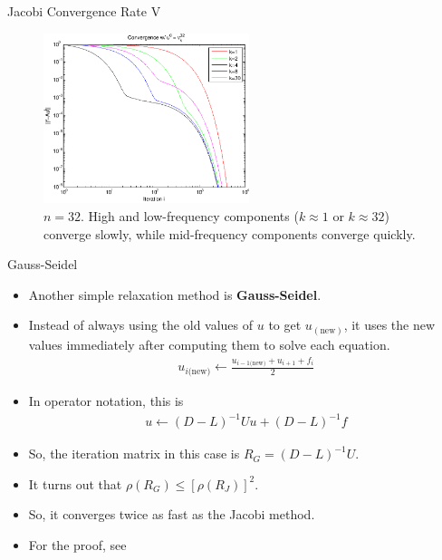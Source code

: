 \documentclass{beamer}
\begin{document}
\begin{frame}{Jacobi Convergence Rate V}
 \begin{figure}
  \includegraphics[width=6cm]{images/jacobiConvergence_freq.pdf}
  \caption{$n=32$. High and low-frequency components ($k \approx 1$ or
           $k \approx 32$) converge slowly, while mid-frequency components
           converge quickly.}
 \end{figure}
\end{frame}

\begin{frame}[label=gaussSeidel]{Gauss-Seidel}
 \begin{itemize}
  \item Another simple relaxation method is \textbf{Gauss-Seidel}.
  \item Instead of always using the old values of $u$ to get $u_{(\text{new})}$,
        it uses the new values immediately after computing them to solve each
        equation.
  \begin{align}
   u_{i\text{(new)}} \leftarrow \frac{u_{i-1\text{(new)}}+u_{i+1}+f_i}{2}
  \end{align}
  \item In operator notation, this is
  \begin{align}
   u \leftarrow (D-L)^{-1}Uu + (D-L)^{-1}f
  \end{align}
  \item So, the iteration matrix in this case is $R_G=(D-L)^{-1}U$.
  \item It turns out that $\rho(R_G) \leq \left[\rho(R_J)\right]^{2}$.
  \item So, it converges twice as fast as the Jacobi method.
  \item For the proof, see
        \hyperlink{gaussSeidelProof}{}
 \end{itemize}
\end{frame}
\end{document}
